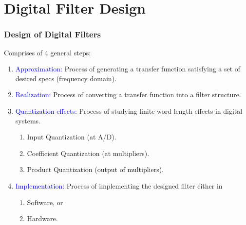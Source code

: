 \documentclass[mathserif, 10pt]{beamer} %
\begin{document}
\section{Digital Filter Design}
\frame
{
\normalsize



\frametitle{Design of Digital Filters}

Comprises of 4 general steps:\\

\begin{enumerate}
	\item \textcolor{blue}{Approximation:} Process of generating a transfer function satisfying a set of desired specs (frequency domain).
	\item \textcolor{blue}{Realization:} Process of converting a transfer function into a filter structure.
	\item \textcolor{blue}{Quantization effects:} Process of studying finite word length effects in digital systems.

		\begin{enumerate}[i]
			\item Input Quantization (at A/D).
			\item Coefficient Quantization  (at multipliers).
			\item Product Quantization  (output of multipliers).
		\end{enumerate}
	\item \textcolor{blue}{Implementation:} Process of implementing the designed filter either in
		\begin{enumerate}[i]
			\item Software, or
			\item Hardware.
		\end{enumerate}
\end{enumerate}




}
\end{document}
